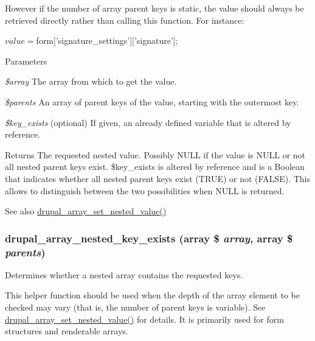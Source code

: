 However if the number of array parent keys is static, the value should always be retrieved directly rather than calling this function. For instance: 
\begin{DoxyCode}
 $value = $form['signature_settings']['signature'];
\end{DoxyCode}



\begin{DoxyParams}{Parameters}
\item[{\em \$array}]The array from which to get the value. \item[{\em \$parents}]An array of parent keys of the value, starting with the outermost key. \item[{\em \$key\_\-exists}](optional) If given, an already defined variable that is altered by reference.\end{DoxyParams}
\begin{DoxyReturn}{Returns}
The requested nested value. Possibly NULL if the value is NULL or not all nested parent keys exist. \$key\_\-exists is altered by reference and is a Boolean that indicates whether all nested parent keys exist (TRUE) or not (FALSE). This allows to distinguish between the two possibilities when NULL is returned.
\end{DoxyReturn}
\begin{DoxySeeAlso}{See also}
\hyperlink{common_8inc_a8a4f31053469df300ce2812a57992c5b}{drupal\_\-array\_\-set\_\-nested\_\-value()} 
\end{DoxySeeAlso}
\hypertarget{common_8inc_a362d9c34bb8625f88e640906d457c0b4}{
\subsubsection[{drupal\_\-array\_\-nested\_\-key\_\-exists}]{\setlength{\rightskip}{0pt plus 5cm}drupal\_\-array\_\-nested\_\-key\_\-exists (array \$ {\em array}, \/  array \$ {\em parents})}}
\label{common_8inc_a362d9c34bb8625f88e640906d457c0b4}
Determines whether a nested array contains the requested keys.

This helper function should be used when the depth of the array element to be checked may vary (that is, the number of parent keys is variable). See \hyperlink{common_8inc_a8a4f31053469df300ce2812a57992c5b}{drupal\_\-array\_\-set\_\-nested\_\-value()} for details. It is primarily used for form structures and renderable arrays.


